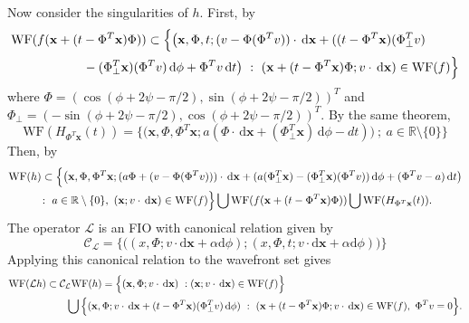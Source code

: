 \documentclass[a4paper,12pt]{amsart}
\numberwithin{equation}{section}
\theoremstyle{plain}
\numberwithin{theorem}{section}
\theoremstyle{definition}
\theoremstyle{remark}
\theoremstyle{remark}
\theoremstyle{remark}
\renewcommand{\d}{\,\mathrm{d}}  %
\newcommand{\dd}{\mathrm{d}}  %
\newcommand{\WF}{\mathrm{WF}}                         %
\newcommand{\vx}{{\mathbf{x}}}
\newcommand{\seanc}[1]{\begin{quotation}\textbf{Sean's comment:\
}{\textit{#1}}\end{quotation}}
\begin{document}


Now consider the singularities of $h$. First, by \cite[Theorem 8.2.4]{hormanderI}
\[
\begin{split}
& \WF(f(\vx+(t-\Phi^T\vx) \Phi)) \subset \Big \{ \big (\vx,\Phi,t; (v - \Phi (\Phi^Tv)) \cdot \d \vx + ((t-\Phi^T\vx) (\Phi_\perp^T v) \\
& \hskip2cm -(\Phi_\perp^T \vx) (\Phi^T v) \d \phi + \Phi^T v \d t\big )\  : \ (\vx + (t - \Phi^T \vx) \Phi; v \cdot \d \vx) \in \WF(f) \Big \}
\end{split}
\]
where $\Phi = (\cos(\phi+2\psi-\pi/2),\sin(\phi+2\psi-\pi/2))^T$ and $\Phi_\perp = (-\sin(\phi+2\psi-\pi/2),\cos(\phi+2\psi-\pi/2))^T$. By the same theorem,
\[
\WF(H_{\Phi^T \vx}(t)) = \Big \{ \big (\vx,\Phi,\Phi^T \vx; a(\Phi \cdot \d \vx + (\Phi_\perp^T \vx)\d \phi - dt)\big ) \ ; \ a \in \mathbb{R}\setminus \{0\} \Big \}
\]
Then, by \cite[Theorem 8.2.10]{hormanderI}
\[
\begin{split}
& \WF(h) \subset \Big \{ \big (\vx, \Phi, \Phi^T \vx ; (a \Phi + (v - \Phi (\Phi^T v))) \cdot \d \vx + (a (\Phi_\perp^T \vx) - (\Phi_\perp^T \vx) (\Phi^T v)) \d \phi + (\Phi^T v - a) \d t   \big ) \\
& \hskip1cm : \ a \in \mathbb{R}\setminus \{0\}, \ (\vx; v \cdot \d \vx) \in \WF(f) \Big \} \bigcup \WF(f(\vx+(t-\Phi^T\vx) \Phi)) \bigcup \WF(H_{\Phi^T \vx}(t)).
\end{split}
\]
The operator $\mathcal{L}$ is an FIO with canonical relation given by
\[
\mathcal{C}_\mathcal{L} = \Big \{ \big ((x,\Phi; v\cdot \dd \vx + \alpha \dd \phi); ( x,\Phi, t ; v\cdot \dd \vx + \alpha \dd \phi) \big ) \Big \}
\]
Applying this canonical relation to the wavefront set gives
\[
\begin{split}
& \WF(\mathcal{L}h) \subset \mathcal{C}_{\mathcal{L}} \WF(h) = \Big \{(\vx,\Phi; v \cdot \d \vx) \ : (\vx; v \cdot \d \vx ) \in \WF(f) \Big \}
\\ &\hskip2cm \bigcup \Big \{ (\vx,
\Phi; v \cdot \d \vx + (t-\Phi^T\vx) (\Phi_\perp^T v) \d \phi) \ : \ (\vx+ (t - \Phi^T \vx) \Phi; v \cdot \d \vx) \in \WF(f), \ \Phi^T v = 0 \Big \}.
\end{split}
\]
\end{document}
